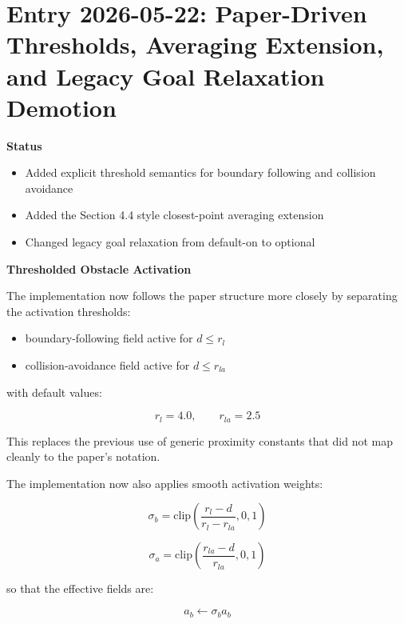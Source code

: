 \documentclass[11pt]{article}
\begin{document}
\section*{Entry 2026-05-22: Paper-Driven Thresholds, Averaging Extension, and Legacy Goal Relaxation Demotion}

\textbf{Status}

\begin{itemize}[leftmargin=*]
  \item Added explicit threshold semantics for boundary following and collision avoidance
  \item Added the Section 4.4 style closest-point averaging extension
  \item Changed legacy goal relaxation from default-on to optional
\end{itemize}

\textbf{Thresholded Obstacle Activation}

The implementation now follows the paper structure more closely by separating
the activation thresholds:

\begin{itemize}[leftmargin=*]
  \item boundary-following field active for $d \le r_l$
  \item collision-avoidance field active for $d \le r_{la}$
\end{itemize}

with default values:

\begin{equation}
r_l = 4.0, \qquad r_{la} = 2.5
\end{equation}

This replaces the previous use of generic proximity constants that did not map
cleanly to the paper's notation.

The implementation now also applies smooth activation weights:

\begin{equation}
\sigma_b =
\mathrm{clip}\left(
\frac{r_l - d}{r_l - r_{la}}, 0, 1
\right)
\end{equation}

\begin{equation}
\sigma_a =
\mathrm{clip}\left(
\frac{r_{la} - d}{r_{la}}, 0, 1
\right)
\end{equation}

so that the effective fields are:

\begin{equation}
a_b \leftarrow \sigma_b a_b
\end{equation}
\end{document}
